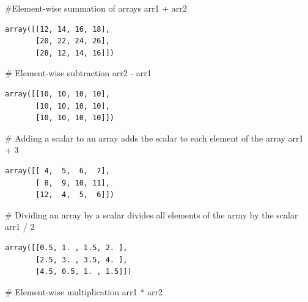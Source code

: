 \documentclass[
  letterpaper,
  DIV=11,
  numbers=noendperiod]{scrreprt}
\newenvironment{Shaded}{\begin{snugshade}}{\end{snugshade}}
\newcommand{\CommentTok}[1]{\textcolor[rgb]{0.37,0.37,0.37}{#1}}
\newcommand{\DecValTok}[1]{\textcolor[rgb]{0.68,0.00,0.00}{#1}}
\newcommand{\NormalTok}[1]{\textcolor[rgb]{0.00,0.23,0.31}{#1}}
\newcommand{\OperatorTok}[1]{\textcolor[rgb]{0.37,0.37,0.37}{#1}}
\begin{document}
\begin{Shaded}
\begin{Highlighting}[]
\CommentTok{\#Element{-}wise summation of arrays}
\NormalTok{arr1 }\OperatorTok{+}\NormalTok{ arr2}
\end{Highlighting}
\end{Shaded}

\begin{verbatim}
array([[12, 14, 16, 18],
       [20, 22, 24, 26],
       [28, 12, 14, 16]])
\end{verbatim}

\begin{Shaded}
\begin{Highlighting}[]
\CommentTok{\# Element{-}wise subtraction}
\NormalTok{arr2 }\OperatorTok{{-}}\NormalTok{ arr1}
\end{Highlighting}
\end{Shaded}

\begin{verbatim}
array([[10, 10, 10, 10],
       [10, 10, 10, 10],
       [10, 10, 10, 10]])
\end{verbatim}

\begin{Shaded}
\begin{Highlighting}[]
\CommentTok{\# Adding a scalar to an array adds the scalar to each element of the array}
\NormalTok{arr1 }\OperatorTok{+} \DecValTok{3}
\end{Highlighting}
\end{Shaded}

\begin{verbatim}
array([[ 4,  5,  6,  7],
       [ 8,  9, 10, 11],
       [12,  4,  5,  6]])
\end{verbatim}

\begin{Shaded}
\begin{Highlighting}[]
\CommentTok{\# Dividing an array by a scalar divides all elements of the array by the scalar}
\NormalTok{arr1 }\OperatorTok{/} \DecValTok{2}
\end{Highlighting}
\end{Shaded}

\begin{verbatim}
array([[0.5, 1. , 1.5, 2. ],
       [2.5, 3. , 3.5, 4. ],
       [4.5, 0.5, 1. , 1.5]])
\end{verbatim}

\begin{Shaded}
\begin{Highlighting}[]
\CommentTok{\# Element{-}wise multiplication}
\NormalTok{arr1 }\OperatorTok{*}\NormalTok{ arr2}
\end{Highlighting}
\end{Shaded}
\end{document}
